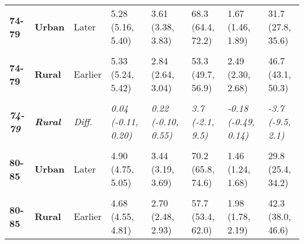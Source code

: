 \begin{table}[!h]
{{\begin{tabular}[t]{>{}l>{}lllllll}
\cmidrule{1-8}
\textbf{74-79} & \textbf{Urban} & Later & 5.28 (5.16, 5.40) & 3.61 (3.38, 3.83) & 68.3 (64.4, 72.2) & 1.67 (1.46, 1.89) & 31.7 (27.8, 35.6)\\
\cmidrule{1-8}
\em{\textbf{\cellcolor{gray!10}{74-79}}} & \em{\textbf{\cellcolor{gray!10}{Urban}}} & \em{\cellcolor{gray!10}{Diff.}} & \em{\cellcolor{gray!10}{0.06 (-0.12, 0.23)}} & \em{\cellcolor{gray!10}{0.51 (0.19, 0.83)**}} & \em{\cellcolor{gray!10}{9.0 (3.4, 14.6)**}} & \em{\cellcolor{gray!10}{-0.45 (-0.75, -0.15)**}} & \em{\cellcolor{gray!10}{-9.0 (-14.6, -3.4)**}}\\
\cmidrule{1-8}
\textbf{74-79} & \textbf{Rural} & Earlier & 5.33 (5.24, 5.42) & 2.84 (2.64, 3.04) & 53.3 (49.7, 56.9) & 2.49 (2.30, 2.68) & 46.7 (43.1, 50.3)\\
\cmidrule{1-8}
\textbf{\cellcolor{gray!10}{74-79}} & \textbf{\cellcolor{gray!10}{Rural}} & \cellcolor{gray!10}{Later} & \cellcolor{gray!10}{5.37 (5.24, 5.50)} & \cellcolor{gray!10}{3.06 (2.81, 3.32)} & \cellcolor{gray!10}{57.0 (52.4, 61.6)} & \cellcolor{gray!10}{2.31 (2.06, 2.56)} & \cellcolor{gray!10}{43.0 (38.4, 47.6)}\\
\cmidrule{1-8}
\em{\textbf{74-79}} & \em{\textbf{Rural}} & \em{Diff.} & \em{0.04 (-0.11, 0.20)} & \em{0.22 (-0.10, 0.55)} & \em{3.7 (-2.1, 9.5)} & \em{-0.18 (-0.49, 0.14)} & \em{-3.7 (-9.5, 2.1)}\\
\cmidrule{1-8}
\textbf{\cellcolor{gray!10}{80-85}} & \textbf{\cellcolor{gray!10}{Urban}} & \cellcolor{gray!10}{Earlier} & \cellcolor{gray!10}{4.87 (4.74, 5.00)} & \cellcolor{gray!10}{2.88 (2.63, 3.12)} & \cellcolor{gray!10}{59.1 (54.3, 63.8)} & \cellcolor{gray!10}{1.99 (1.76, 2.23)} & \cellcolor{gray!10}{40.9 (36.2, 45.7)}\\
\cmidrule{1-8}
\textbf{80-85} & \textbf{Urban} & Later & 4.90 (4.75, 5.05) & 3.44 (3.19, 3.69) & 70.2 (65.8, 74.6) & 1.46 (1.24, 1.68) & 29.8 (25.4, 34.2)\\
\cmidrule{1-8}
\em{\textbf{\cellcolor{gray!10}{80-85}}} & \em{\textbf{\cellcolor{gray!10}{Urban}}} & \em{\cellcolor{gray!10}{Diff.}} & \em{\cellcolor{gray!10}{0.03 (-0.17, 0.23)}} & \em{\cellcolor{gray!10}{0.56 (0.21, 0.91)**}} & \em{\cellcolor{gray!10}{11.1 (4.7, 17.6)***}} & \em{\cellcolor{gray!10}{-0.53 (-0.85, -0.22)**}} & \em{\cellcolor{gray!10}{-11.1 (-17.6, -4.7)***}}\\
\cmidrule{1-8}
\textbf{80-85} & \textbf{Rural} & Earlier & 4.68 (4.55, 4.81) & 2.70 (2.48, 2.93) & 57.7 (53.4, 62.0) & 1.98 (1.78, 2.19) & 42.3 (38.0, 46.6)\\
\cmidrule{1-8}

\end{tabular}}}
\end{table}

